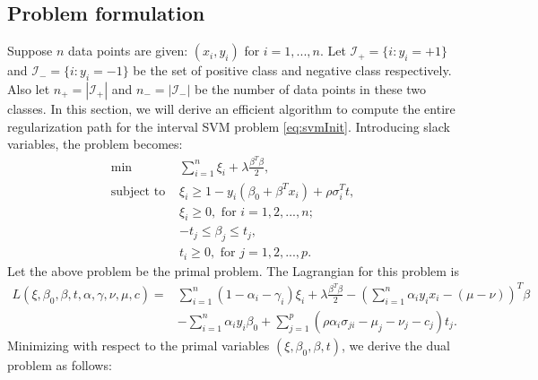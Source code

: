 \documentclass[10pt]{article}
\theoremstyle{definition}
\begin{document}
\subsection{Problem formulation}
Suppose $n$ data points are given: $(x_i,y_i)$ for $i=1,...,n$. Let $\mathcal I_+ = \{i: y_i=+1\}$ and $\mathcal I_- = \{i: y_i=-1\}$ be the set of positive class and negative class respectively. Also let $n_+=|\mathcal I_+|$ and $n_-=|\mathcal I_-|$ be the number of data points in these two classes. In this section, we will derive an efficient algorithm to compute the entire regularization path for the interval SVM problem \eqref{eq:svmInit}.
Introducing slack variables, the problem becomes:
\begin{align}
\label{eq:primal}
\min & \sum_{i=1}^n\xi_i + \lambda\frac{\beta^T\beta}{2}, \\
\text{subject to } & \xi_i \geq 1 - y_i(\beta_0+\beta^Tx_i)+\rho \sigma_i^Tt,\nonumber \\
                   & \xi_i \geq 0, \text{ for }i=1,2,...,n; \nonumber\\
                   & -t_j\leq \beta_j \leq t_j,\nonumber\\
                   & t_i \geq 0, \text{ for } j=1,2,...,p. \nonumber                      
\end{align}
Let the above problem be the primal problem. The Lagrangian for this problem is
\[
\begin{array}{rl}
L(\xi,\beta_0,\beta,t,\alpha,\gamma,\nu,\mu,c)
= & \sum_{i=1}^n(1-\alpha_i-\gamma_i)\xi_i + \lambda\frac{\beta^T\beta}{2} - (\sum_{i=1}^n \alpha_iy_ix_i - (\mu-\nu))^T\beta \\
  & - \sum_{i=1}^n\alpha_iy_i\beta_0 + \sum_{j=1}^p(\rho\alpha_i\sigma_{ji} - \mu_j-\nu_j-c_j)t_j.
\end{array}
\]
Minimizing with respect to the primal variables $(\xi,\beta_0,\beta,t)$, we derive the dual problem as follows:
\end{document}

